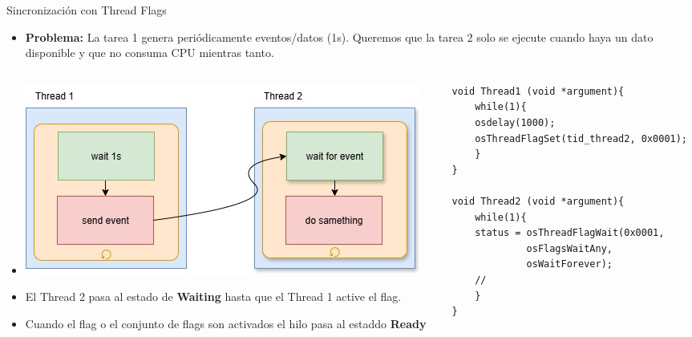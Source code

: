 \begin{frame}[fragile]{Sincronización con Thread Flags}
      \begin{itemize}
          \item \textbf{Problema:} La tarea 1 genera periódicamente eventos/datos (1s). Queremos que la tarea 2 solo se ejecute cuando haya un dato disponible y que no consuma CPU mientras tanto.
      \end{itemize}
      \begin{columns}
            \begin{column}{0.50\textwidth}
                \begin{itemize}
                    \item[]                      
                    \includegraphics[scale=0.25]{presentation/flags.jpg}
                    \item El Thread 2 pasa al estado de \textbf{Waiting} hasta que el Thread 1 active el flag.
                    \item Cuando el flag o el conjunto de flags son activados el hilo pasa al estaddo \textbf{Ready}
                \end{itemize}
            \end{column}
            \begin{column}{0.50\textwidth}
             \begin{verbatim}
void Thread1 (void *argument){
    while(1){
    osdelay(1000);
    osThreadFlagSet(tid_thread2, 0x0001);
    }
}

void Thread2 (void *argument){
    while(1){
    status = osThreadFlagWait(0x0001,
             osFlagsWaitAny, 
             osWaitForever);
    //
    }
}
             \end{verbatim}
             
            \end{column}
     \end{columns}
\end{frame}

